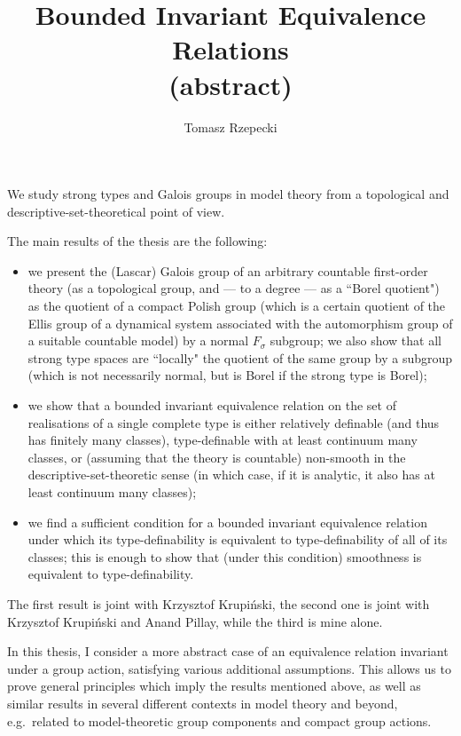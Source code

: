 \documentclass[12pt,a4paper]{article}
\title{Bounded Invariant Equivalence Relations\\(abstract)}
\author{Tomasz Rzepecki}
\date{}
\begin{document}
	\maketitle
	
	We study strong types and Galois groups in model theory from a topological and descriptive-set-theoretical point of view.
	
	The main results of the thesis are the following:
	\begin{itemize}
		\item
		we present the (Lascar) Galois group of an arbitrary countable first-order theory (as a topological group, and --- to a degree --- as a ``Borel quotient") as the quotient of a compact Polish group (which is a certain quotient of the Ellis group of a dynamical system associated with the automorphism group of a suitable countable model) by a normal $F_\sigma$ subgroup; we also show that all strong type spaces are ``locally" the quotient of the same group by a subgroup (which is not necessarily normal, but is Borel if the strong type is Borel);
		\item
		we show that a bounded invariant equivalence relation on the set of realisations of a single complete type is either relatively definable (and thus has finitely many classes), type-definable with at least continuum many classes, or (assuming that the theory is countable) non-smooth in the descriptive-set-theoretic sense (in which case, if it is analytic, it also has at least continuum many classes);
		\item
		we find a sufficient condition for a bounded invariant equivalence relation under which its type-definability is equivalent to type-definability of all of its classes; this is enough to show that (under this condition) smoothness is equivalent to type-definability.
	\end{itemize}
	The first result is joint with Krzysztof Krupiński, the second one is joint with Krzysztof Krupiński and Anand Pillay, while the third is mine alone.
	
	In this thesis, I consider a more abstract case of an equivalence relation invariant under a group action, satisfying various additional assumptions. This allows us to prove general principles which imply the results mentioned above, as well as similar results in several different contexts in model theory and beyond, e.g.\ related to model-theoretic group components and compact group actions.
	
\end{document}

